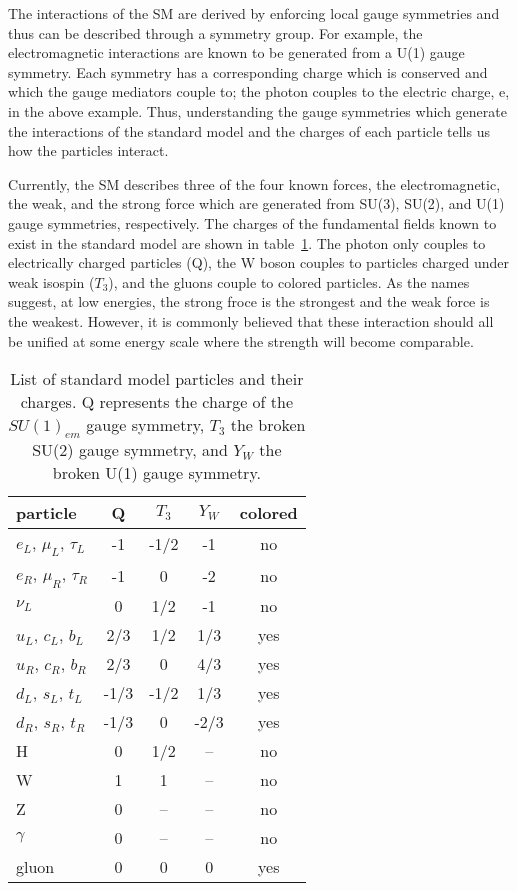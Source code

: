 The interactions of the SM are derived by enforcing local gauge 
symmetries and
thus can be described through a symmetry group.  For example, the 
electromagnetic interactions are known to be generated from a U(1) 
gauge symmetry.  Each symmetry has a corresponding charge which is
conserved and which the gauge mediators couple to; the photon 
couples to the electric charge, e, in the above example.  
Thus, understanding the gauge symmetries
which generate the interactions of the standard model and the 
charges of
each particle tells us how the particles interact.

Currently, the SM describes three of the four known forces, the
electromagnetic, the weak, and the strong force which are generated
from SU(3), SU(2), and U(1) gauge symmetries, respectively.  
The charges 
of the fundamental
fields known to exist in the standard model are shown in 
table~\ref{table:SMcharges}.  
The photon only couples to electrically charged
particles (Q), the W boson couples to particles charged under weak 
isospin ($T_3$), 
and the gluons couple to colored particles. As the names 
suggest, at low energies, the strong froce is the strongest
and the weak force is the weakest.  However, it is commonly believed that these interaction
should all be unified at some energy scale where the strength will become
comparable.   

\begin{table}
\begin{center}
\begin{tabular}{l|c|c|c|c}
\hline 
\hline
particle & Q  & $T_3$ & $Y_W$ & colored \\ \hline \hline
$e_L$, $\mu_L$, $\tau_L$  & -1 & -1/2   &  -1 &  no \\ 
$e_R$, $\mu_R$, $\tau_R$  & -1 & 0      &  -2 &  no \\ 
$\nu_L$  & 0   & 1/2 & -1 & no \\ 
$u_L$, $c_L$, $b_L$    & 2/3 & 1/2  & 1/3& yes \\ 
$u_R$, $c_R$, $b_R$    & 2/3 & 0  & 4/3& yes \\ 
$d_L$, $s_L$, $t_L$    & -1/3& -1/2 & 1/3& yes \\ 
$d_R$, $s_R$, $t_R$    & -1/3& 0 & -2/3& yes \\
H        & 0   & 1/2  & -- & no \\
W        & 1   & 1    & -- & no \\
Z        & 0   & --   & -- & no \\
$\gamma$ & 0   & --   & -- & no \\
gluon    & 0   & 0    & 0  & yes \\
\hline
\end{tabular}
\end{center}
\caption{List of standard model particles and their charges. 
Q represents the charge of the $SU(1)_{em}$ gauge symmetry,
$T_3$ the broken SU(2) gauge symmetry, and $Y_W$ the broken 
U(1) gauge symmetry.}
\label{table:SMcharges}
\end{table}

